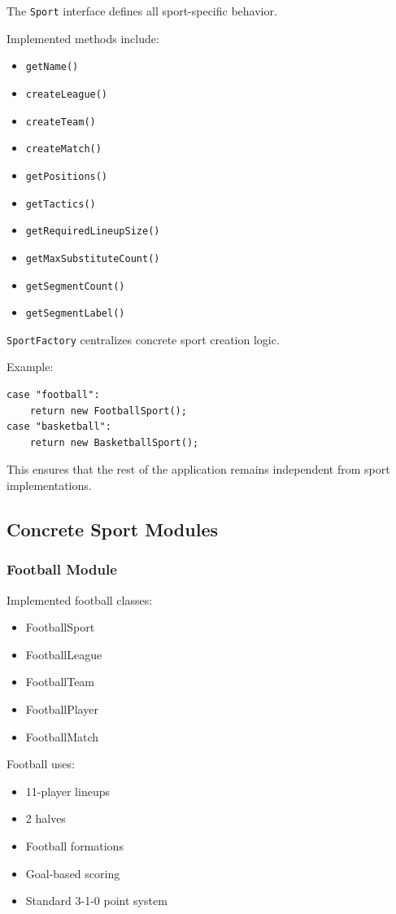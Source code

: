 \documentclass[11pt,a4paper]{article}
\begin{document}
The \texttt{Sport} interface defines all sport-specific behavior.

Implemented methods include:
\begin{itemize}
\item \texttt{getName()}
\item \texttt{createLeague()}
\item \texttt{createTeam()}
\item \texttt{createMatch()}
\item \texttt{getPositions()}
\item \texttt{getTactics()}
\item \texttt{getRequiredLineupSize()}
\item \texttt{getMaxSubstituteCount()}
\item \texttt{getSegmentCount()}
\item \texttt{getSegmentLabel()}
\end{itemize}

\texttt{SportFactory} centralizes concrete sport creation logic.

Example:
\begin{verbatim}
case "football":
    return new FootballSport();
case "basketball":
    return new BasketballSport();
\end{verbatim}

This ensures that the rest of the application remains independent from sport implementations.

\subsection{Concrete Sport Modules}

\subsubsection*{Football Module}

Implemented football classes:
\begin{itemize}
\item FootballSport
\item FootballLeague
\item FootballTeam
\item FootballPlayer
\item FootballMatch
\end{itemize}

Football uses:
\begin{itemize}
\item 11-player lineups
\item 2 halves
\item Football formations
\item Goal-based scoring
\item Standard 3-1-0 point system
\end{itemize}
\end{document}
